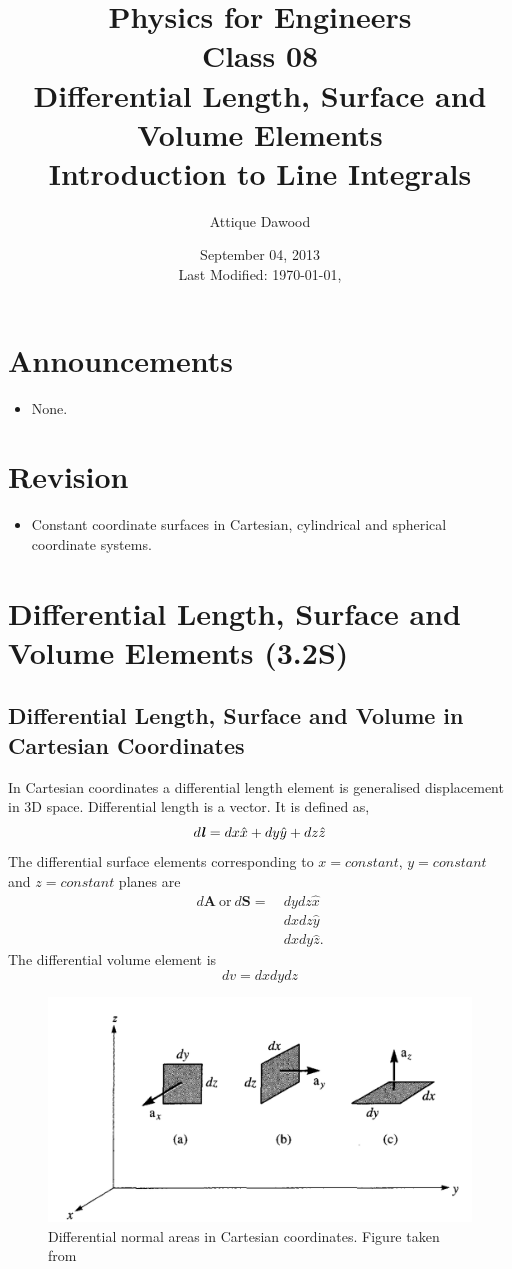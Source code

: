 \documentclass[12pt,a4paper]{article}
\title{\vspace{-2cm}Physics for Engineers\\Class 08\\Differential Length, Surface and Volume Elements\\Introduction to Line Integrals}
\author{Attique Dawood}
\date{September 04, 2013\\[0.2cm] Last Modified: \today, \currenttime}
\begin{document}
\maketitle
\section{Announcements}
\begin{itemize}
\item None.
\end{itemize}
\section{Revision}
\begin{itemize}
\item Constant coordinate surfaces in Cartesian, cylindrical and spherical coordinate systems.
\end{itemize}
\section{Differential Length, Surface and Volume Elements (3.2S)}
\subsection{Differential Length, Surface and Volume in Cartesian Coordinates}
In Cartesian coordinates a differential length element is generalised displacement in 3D space. Differential length is a vector. It is defined as,
\begin{equation}
d\textbf{\textit{l}}=dx\hat x+dy\hat y+dz\hat z
\end{equation}
The differential surface elements corresponding to $x=constant$, $y=constant$ and $z=constant$ planes are
\begin{equation}
\begin{split}
d\textbf{A}~\mathrm{or}~d\textbf{S}=~&dydz\hat x\\
&dxdz\hat y\\
&dxdy\hat z.
\end{split}
\end{equation}
The differential volume element is
\begin{equation}
dv=dxdydz
\end{equation}
\begin{figure}[H]
\centering
\includegraphics[scale=0.3]{Figure3-2S.png}
\caption{Differential normal areas in Cartesian coordinates. Figure taken from~\cite[Figure 3.2, page 54]{Sadiku}}
\label{Cartesian-differential-area}
\end{figure}
\end{document}
